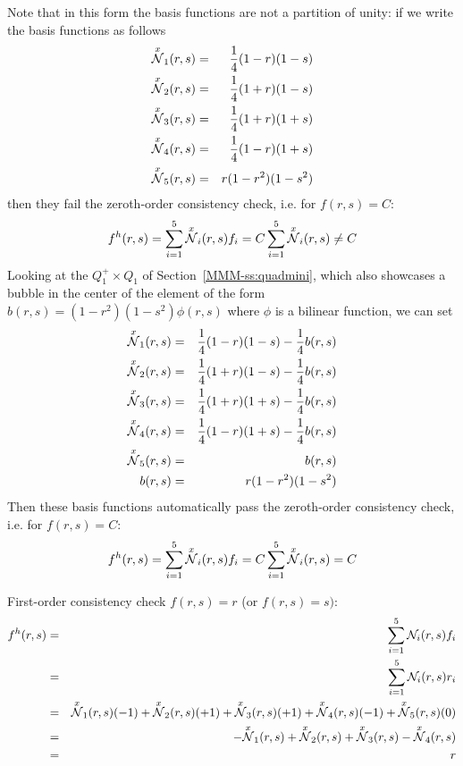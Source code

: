 Note that in this form the basis functions are not a partition of unity: if 
we write the basis functions as follows
\begin{eqnarray}
\overset{x}{{\mathcal{N}}}_1(r,s) &=& \frac14(1-r)(1-s)  \nonumber\\
\overset{x}{{\mathcal{N}}}_2(r,s) &=& \frac14(1+r)(1-s)  \nonumber\\
\overset{x}{{\mathcal{N}}}_3(r,s) &=& \frac14(1+r)(1+s)  \nonumber\\
\overset{x}{{\mathcal{N}}}_4(r,s) &=& \frac14(1-r)(1+s)  \nonumber\\
\overset{x}{{\mathcal{N}}}_5(r,s) &=& r(1-r^2)(1-s^2) \nonumber
\end{eqnarray}
then they fail the zeroth-order consistency check, i.e. for $f(r,s)=C$:
\begin{equation}
f^h(r,s) 
= \sum_{i=1}^5 \overset{x}{{\mathcal{N}}}_i(r,s) f_i \\
= C \sum_{i=1}^5 \overset{x}{{\mathcal{N}}}_i(r,s)  \\
\neq  C
\end{equation}
Looking at the $Q_1^+\times Q_1$ of Section~\ref{MMM-ss:quadmini}, which also 
showcases a bubble in the center of the element of the form 
$b(r, s) = (1- r^2 )(1 -s^2 ) \phi(r,s)$ where $\phi$ is a bilinear function,
we can set
\begin{eqnarray}
\overset{x}{{\mathcal{N}}}_1(r,s) &=& \frac14(1-r)(1-s) -\frac14 b(r,s) \\
\overset{x}{{\mathcal{N}}}_2(r,s) &=& \frac14(1+r)(1-s) -\frac14 b(r,s)  \\
\overset{x}{{\mathcal{N}}}_3(r,s) &=& \frac14(1+r)(1+s) -\frac14 b(r,s)  \\
\overset{x}{{\mathcal{N}}}_4(r,s) &=& \frac14(1-r)(1+s) -\frac14 b(r,s)  \\
\overset{x}{{\mathcal{N}}}_5(r,s) &=&  b(r,s) \\
b(r,s) &=& r(1-r^2)(1-s^2)
\end{eqnarray}
Then these basis functions automatically pass the zeroth-order consistency check, i.e. for $f(r,s)=C$:
\begin{equation}
f^h(r,s) 
= \sum_{i=1}^5 \overset{x}{{\mathcal{N}}}_i(r,s) f_i \\
= C \sum_{i=1}^5 \overset{x}{{\mathcal{N}}}_i(r,s)  \\
=  C
\end{equation}

First-order consistency check $f(r,s)=r$ (or $f(r,s)=s)$:
\begin{eqnarray}
f^h(r,s) 
&=& \sum_{i=1}^5 {\mathcal{N}}_i(r,s) f_i \nonumber\\
&=& \sum_{i=1}^5 {\mathcal{N}}_i(r,s) r_i \nonumber\\
&=& \overset{x}{{\mathcal{N}}}_1(r,s) (-1) + \overset{x}{{\mathcal{N}}}_2(r,s) (+1) + \overset{x}{{\mathcal{N}}}_3(r,s) (+1) + \overset{x}{{\mathcal{N}}}_4(r,s) (-1) + \overset{x}{{\mathcal{N}}}_5(r,s) (0) \nonumber\\
&=& -\overset{x}{{\mathcal{N}}}_1(r,s)+\overset{x}{{\mathcal{N}}}_2(r,s)+\overset{x}{{\mathcal{N}}}_3(r,s)-\overset{x}{{\mathcal{N}}}_4(r,s) \nonumber\\
&=& r
\end{eqnarray}


